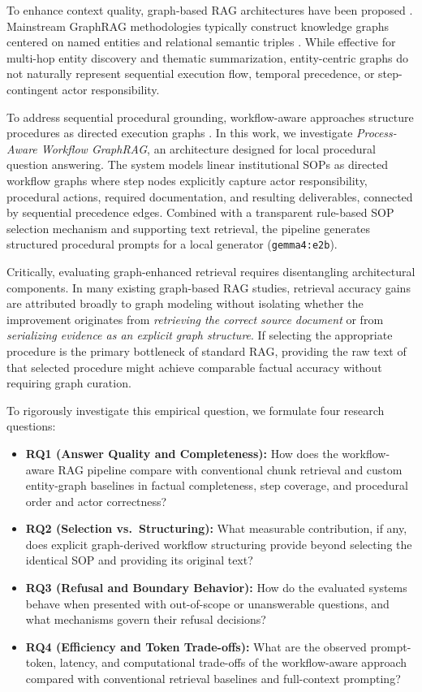 \documentclass[preprint,10pt]{elsarticle}
\begin{document}
To enhance context quality, graph-based RAG architectures have been proposed \cite{peng2024graphragsurvey,pan2024unifying}. Mainstream GraphRAG methodologies typically construct knowledge graphs centered on named entities and relational semantic triples \cite{edge2024graphrag,guo2024lightrag,gutierrez2024hipporag}. While effective for multi-hop entity discovery and thematic summarization, entity-centric graphs do not naturally represent sequential execution flow, temporal precedence, or step-contingent actor responsibility.

To address sequential procedural grounding, workflow-aware approaches structure procedures as directed execution graphs \cite{dumas2018fundamentals}. In this work, we investigate \emph{Process-Aware Workflow GraphRAG}, an architecture designed for local procedural question answering. The system models linear institutional SOPs as directed workflow graphs where step nodes explicitly capture actor responsibility, procedural actions, required documentation, and resulting deliverables, connected by sequential precedence edges. Combined with a transparent rule-based SOP selection mechanism and supporting text retrieval, the pipeline generates structured procedural prompts for a local generator (\texttt{gemma4:e2b}).

Critically, evaluating graph-enhanced retrieval requires disentangling architectural components. In many existing graph-based RAG studies, retrieval accuracy gains are attributed broadly to graph modeling without isolating whether the improvement originates from \emph{retrieving the correct source document} or from \emph{serializing evidence as an explicit graph structure}. If selecting the appropriate procedure is the primary bottleneck of standard RAG, providing the raw text of that selected procedure might achieve comparable factual accuracy without requiring graph curation.

To rigorously investigate this empirical question, we formulate four research questions:
\begin{itemize}[leftmargin=*]
\item \textbf{RQ1 (Answer Quality and Completeness):} How does the workflow-aware RAG pipeline compare with conventional chunk retrieval and custom entity-graph baselines in factual completeness, step coverage, and procedural order and actor correctness?
\item \textbf{RQ2 (Selection vs.\ Structuring):} What measurable contribution, if any, does explicit graph-derived workflow structuring provide beyond selecting the identical SOP and providing its original text?
\item \textbf{RQ3 (Refusal and Boundary Behavior):} How do the evaluated systems behave when presented with out-of-scope or unanswerable questions, and what mechanisms govern their refusal decisions?
\item \textbf{RQ4 (Efficiency and Token Trade-offs):} What are the observed prompt-token, latency, and computational trade-offs of the workflow-aware approach compared with conventional retrieval baselines and full-context prompting?
\end{itemize}
\end{document}
